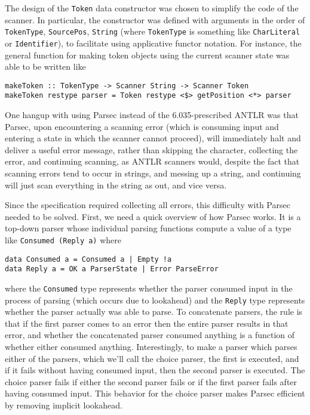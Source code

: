 \documentclass[11pt]{article}
\begin{document}
The design of the \texttt{Token} data constructor was chosen to
simplify the code of the scanner.  In particular, the constructor was
defined with arguments in the order of \texttt{TokenType},
\texttt{SourcePos}, \texttt{String} (where \texttt{TokenType} is
something like \texttt{CharLiteral} or \texttt{Identifier}), to
facilitate using applicative functor notation.  For instance, the
general function for making token objects using the current scanner
state was able to be written like
\begin{verbatim}
makeToken :: TokenType -> Scanner String -> Scanner Token
makeToken restype parser = Token restype <$> getPosition <*> parser
\end{verbatim} %

One hangup with using Parsec instead of the 6.035-prescribed ANTLR was
that Parsec, upon encountering a scanning error (which is consuming
input and entering a state in which the scanner cannot proceed), will
immediately halt and deliver a useful error message, rather than
skipping the character, collecting the error, and continuing scanning,
as ANTLR scanners would, despite the fact that scanning errors tend to
occur in strings, and messing up a string, and continuing will just
scan everything in the string as out, and vice versa.

Since the specification required collecting all errors, this
difficulty with Parsec needed to be solved.  First, we need a quick
overview of how Parsec works.  It is a top-down parser whose
individual parsing functions compute a value of a type like
\texttt{Consumed (Reply a)} where
\begin{verbatim}
data Consumed a = Consumed a | Empty !a
data Reply a = OK a ParserState | Error ParseError
\end{verbatim}
where the \texttt{Consumed} type represents whether the parser
consumed input in the process of parsing (which occurs due to
lookahead) and the \texttt{Reply} type represents whether the parser
actually was able to parse.  To concatenate parsers, the rule is that
if the first parser comes to an error then the entire parser results
in that error, and whether the concatenated parser consumed anything
is a function of whether either consumed anything.  Interestingly, to
make a parser which parses either of the parsers, which we'll call the
choice parser, the first is executed, and if it fails without having
consumed input, then the second parser is executed.  The choice parser
fails if either the second parser fails or if the first parser fails
after having consumed input.  This behavior for the choice parser
makes Parsec efficient by removing implicit lookahead.
\end{document}
